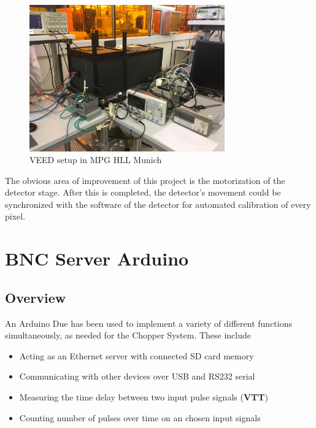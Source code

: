 \documentclass{article}
\begin{document}
    \begin{figure}[h]
        \centering
        \includegraphics[width=0.75\textwidth]{img/munich_setup}
        \caption{VEED setup in MPG HLL Munich}
        \label{fig:veed_setup}
    \end{figure}
    
    The obvious area of improvement of this project is the motorization of the detector stage. After this is completed, the detector's movement could be synchronized with the software of the detector for automated calibration of every pixel.
    
    \section{BNC Server Arduino} \label{arduino}
    
        \subsection{Overview} \label{arduino_overview}
        
        An Arduino Due has been used to implement a variety of different functions simultaneously, as needed for the Chopper System. These include
        
        \begin{itemize}
            \item Acting as an Ethernet server with connected SD card memory
            \item Communicating with other devices over USB and RS232 serial
            \item Measuring the time delay between two input pulse signals (\textbf{VTT})
            \item Counting number of pulses over time on an chosen input signals
        \end{itemize}
        
\end{document}
